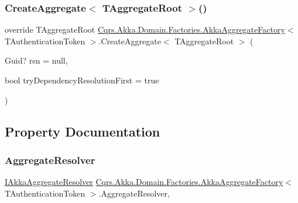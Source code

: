 \subsubsection{\texorpdfstring{Create\+Aggregate$<$ T\+Aggregate\+Root $>$()}{CreateAggregate< TAggregateRoot >()}}
{\footnotesize\ttfamily override T\+Aggregate\+Root \hyperlink{classCqrs_1_1Akka_1_1Domain_1_1Factories_1_1AkkaAggregateFactory}{Cqrs.\+Akka.\+Domain.\+Factories.\+Akka\+Aggregate\+Factory}$<$ T\+Authentication\+Token $>$.Create\+Aggregate$<$ T\+Aggregate\+Root $>$ (\begin{DoxyParamCaption}\item[{Guid?}]{rsn = {\ttfamily null},  }\item[{bool}]{try\+Dependency\+Resolution\+First = {\ttfamily true} }\end{DoxyParamCaption})}



\subsection{Property Documentation}
\mbox{\label{classCqrs_1_1Akka_1_1Domain_1_1Factories_1_1AkkaAggregateFactory_ae83aa4aa5cbe5fe0cc0cea41de002218}} 
\subsubsection{\texorpdfstring{Aggregate\+Resolver}{AggregateResolver}}
{\footnotesize\ttfamily \hyperlink{interfaceCqrs_1_1Akka_1_1Domain_1_1IAkkaAggregateResolver}{I\+Akka\+Aggregate\+Resolver} \hyperlink{classCqrs_1_1Akka_1_1Domain_1_1Factories_1_1AkkaAggregateFactory}{Cqrs.\+Akka.\+Domain.\+Factories.\+Akka\+Aggregate\+Factory}$<$ T\+Authentication\+Token $>$.Aggregate\+Resolver\hspace{0.3cm}{\ttfamily [get]}, {\ttfamily [protected]}}

